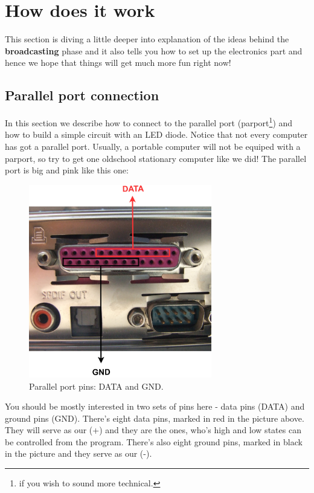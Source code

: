 \documentclass[12pt]{report}
\begin{document}
\section{How does it work} \label{sec:howB}

This section is diving a little deeper into explanation of the ideas behind the \textbf{broadcasting} phase and it also tells you how to set up the electronics part and hence we hope that things will get much more fun right now!

\subsection{Parallel port connection}

In this section we describe how to connect to the parallel port (parport\footnote{if you wish to sound more technical.}) and how to build a simple circuit with an LED diode. Notice that not every computer has got a parallel port. Usually, a portable computer will not be equiped with a parport, so try to get one oldschool stationary computer like we did! The parallel port is big and pink like this one:

\begin{figure}[H]
\centering\includegraphics[width=8cm]{par_port}
\caption{Parallel port pins: DATA and GND.}				
\label{fig:par_port}
\end{figure}

You should be mostly interested in two sets of pins here - data pins (DATA) and ground pins (GND). There's eight data pins, marked in red in the picture above. They will serve as our (+) and they are the ones, who's high and low states can be controlled from the program. There's also eight ground pins, marked in black in the picture and they serve as our (-).
\end{document}
